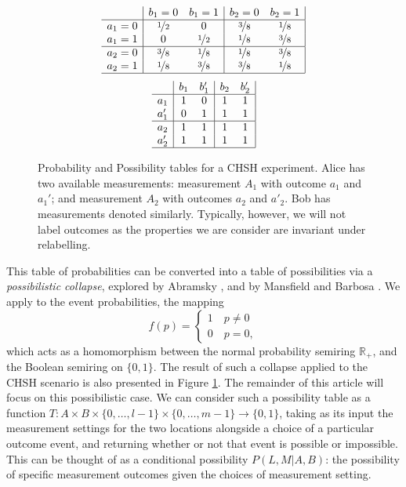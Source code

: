\documentclass[reprint]{revtex4-1}
\theoremstyle{definition}
\begin{document}
\begin{figure}
\begin{equation*}
\begin{array}{c| c c | c c |}
&b_1=0&b_1=1&b_2=0&b_2=1\\ \hline
a_1=0&\nicefrac{1}{2} &0  & \nicefrac{3}{8} & \nicefrac{1}{8}\\
a_1=1&0&\nicefrac{1}{2}  &\nicefrac{1}{8} &\nicefrac{3}{8} \\ \hline
a_2=0&\nicefrac{3}{8}&\nicefrac{1}{8} &\nicefrac{1}{8} &\nicefrac{3}{8}  \\
a_2=1&\nicefrac{1}{8}&\nicefrac{3}{8} &\nicefrac{3}{8} & \nicefrac{1}{8} \\ \hline
\end{array} \end{equation*}\begin{equation*}
\begin{array}{c| c c | c c |}
&b_1&b_1'&b_2&b'_2\\ \hline
a_1&1 &0  &1 & 1\\
a_1'&0&1  &1 &1\\ \hline
a_2&1&1&1 &1 \\
a_2'&1&1 &1 &1 \\ \hline
\end{array} 
\end{equation*}
\caption{Probability and Possibility tables for a CHSH \cite{CHSH1969} experiment. Alice has two available measurements: measurement $A_1$ with outcome $a_1$ and $a_1'$; and measurement $A_2$ with outcomes $a_2$ and $a'_2$. Bob has measurements denoted similarly. Typically, however, we will not label outcomes as the properties we are consider are invariant under relabelling.}
\label{CHSH}
\end{figure}

This table of probabilities can be converted into a table of possibilities via a \emph{possibilistic collapse}, explored by Abramsky \cite{Abra2013-2}, and by Mansfield and Barbosa \cite{Mans2014}. We apply to the event probabilities, the mapping
\begin{equation}
f(p)=\begin{cases} 1 \quad p\neq 0 \\ 0 \quad p=0, \end{cases}
\end{equation}
which acts as a homomorphism between the normal probability semiring $\mathbb{R}_+$, and the Boolean semiring on $\{0,1\}$. The result of such a collapse applied to the CHSH scenario is also presented in Figure \ref{CHSH}. The remainder of this article will focus on this possibilistic case. We can consider such a possibility table as a function $T:A\times B \times \{0,\dots, l-1\}\times \{0,\dots, m-1\}\rightarrow\{0,1\}$, taking as its input the measurement settings for the two locations alongside a choice of a particular outcome event, and returning whether or not that event is possible or impossible. This can be thought of as a conditional possibility $P(L,M|A,B)$: the possibility of specific measurement outcomes given the choices of measurement setting.
\end{document}
